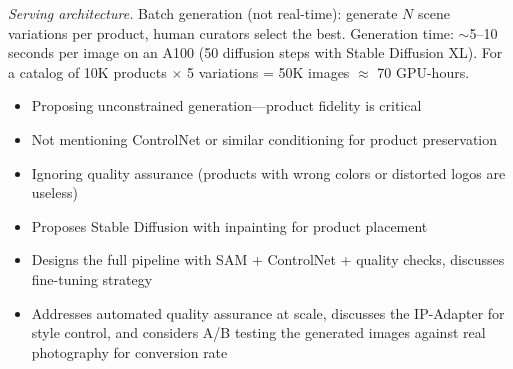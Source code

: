 \begin{interviewq}
\textit{Serving architecture.} Batch generation (not real-time): generate $N$ scene variations per product, human curators select the best. Generation time: $\sim$5--10 seconds per image on an A100 (50 diffusion steps with Stable Diffusion XL). For a catalog of 10K products $\times$ 5 variations = 50K images $\approx$ 70 GPU-hours.

\redflags
\begin{itemize}
    \item Proposing unconstrained generation---product fidelity is critical
    \item Not mentioning ControlNet or similar conditioning for product preservation
    \item Ignoring quality assurance (products with wrong colors or distorted logos are useless)
\end{itemize}


\goodgreat
\begin{itemize}
    \item {} Proposes Stable Diffusion with inpainting for product placement
    \item {} Designs the full pipeline with SAM + ControlNet + quality checks, discusses fine-tuning strategy
    \item {} Addresses automated quality assurance at scale, discusses the IP-Adapter for style control, and considers A/B testing the generated images against real photography for conversion rate
\end{itemize}

\end{interviewq}

